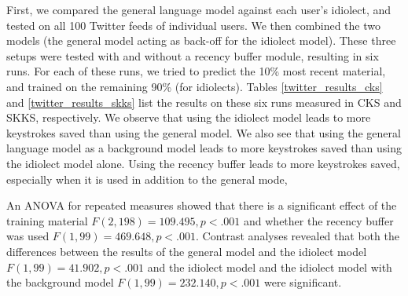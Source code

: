 \documentclass[11pt]{article}
\begin{document}
First, we compared the general language model against each user's idiolect, and tested on all 100 Twitter feeds of individual users. We then combined the two models (the general model acting as back-off for the idiolect model). These three setups were tested with and without a recency buffer module, resulting in six runs. For each of these runs, we tried to predict the 10\% most recent material, and trained on the remaining 90\% (for idiolects). Tables \ref{twitter_results_cks} and \ref{twitter_results_skks} list the results on these six runs measured in CKS and SKKS, respectively. We observe that using the idiolect model leads to more keystrokes saved than using the general model. We also see that using the general language model as a background model leads to more keystrokes saved than using the idiolect model alone. Using the recency buffer leads to more keystrokes saved, especially when it is used in addition to the general mode,

An ANOVA for repeated measures showed that there is a significant effect of the training material $F(2,198) = 109.495, p < .001$ and whether the recency buffer was used $F(1,99) = 469.648, p < .001$. Contrast analyses revealed that both the differences between the results of the general model and the idiolect model $F(1,99) = 41.902, p < .001$ and the idiolect model and the idiolect model with the background model $F(1,99) = 232.140, p < .001$ were significant.
\end{document}
